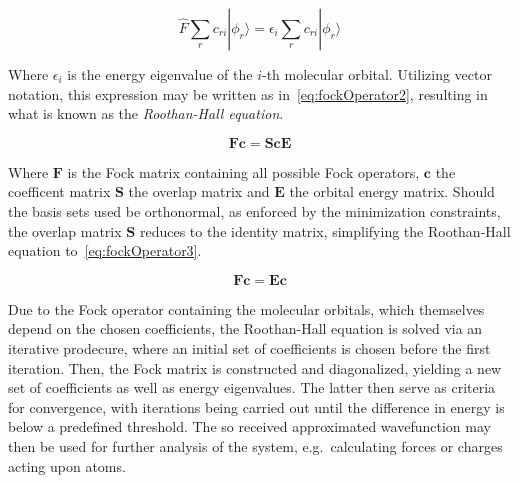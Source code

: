 \documentclass[11pt]{article}
\begin{document}
\begin{equation}
  \hat{F}\sum_{r}^{}c_{r i}|\phi_{r}\rangle = \epsilon_i\sum_{r}^{}c_{r i}|\phi_{r}\rangle
  \label{eq:fockOperator}
\end{equation}

\bigskip

\noindent Where $\epsilon_i$ is the energy eigenvalue of the $i$-th molecular orbital. Utilizing vector notation, this expression may be written as in~\ref{eq:fockOperator2}, resulting in what is known as the \textit{Roothan-Hall equation}.


\begin{equation}
  \mathbf{Fc} = \mathbf{Sc}\mathbf{E}
  \label{eq:fockOperator2}
\end{equation}

\noindent Where $\mathbf{F}$ is the Fock matrix containing all possible Fock operators, $\mathbf{c}$ the coefficent matrix $\mathbf{S}$ the overlap matrix and $\mathbf{E}$ the orbital energy matrix.
Should the basis sets used be orthonormal, as enforced by the minimization constraints, the overlap matrix $\mathbf{S}$ reduces to the identity matrix, simplifying the Roothan-Hall equation to~\ref{eq:fockOperator3}.

\begin{equation}
  \mathbf{Fc} = \mathbf{Ec}
  \label{eq:fockOperator3}
\end{equation}

\bigskip

\noindent Due to the Fock operator containing the molecular orbitals, which themselves depend on the chosen coefficients, the Roothan-Hall equation is solved via an iterative prodecure, where an initial set of coefficients is chosen before the first iteration.
Then, the Fock matrix is constructed and diagonalized, yielding a new set of coefficients as well as energy eigenvalues.
The latter then serve as criteria for convergence, with iterations being carried out until the difference in energy is below a predefined threshold.
The so received approximated wavefunction may then be used for further analysis of the system, e.g.~calculating forces or charges acting upon atoms.
\end{document}

